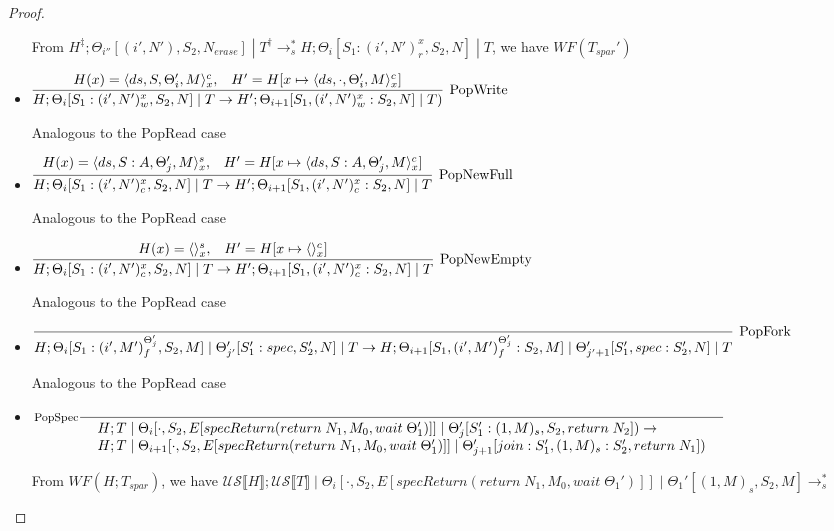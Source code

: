 \documentclass[9pt]{article}
\newcommand\specStep{\rightarrow_{s}}
\newcommand{\eval}[1]{E[#1]}
\newcommand{\unSpec}[1]{\mathcal{US} \llbracket #1 \rrbracket}
\begin{document}
\begin{proof}
\begin{itemize}
From $H^\ddagger; \Theta_{i''}[(i', N'), S_2, N_{erase}] \; | \; T^\dagger \specStep^* H; \Theta_i[S_1 : (i', N')_r^x, S_2, N] \; | \; T$, we have $WF(T_{spar}')$

\item $\infer[\text{PopWrite}]{H; \Theta_i[S_1: (i', N')_w^x, S_2, N] \; | \; T \rightarrow H'; \Theta_{i+1}[S_1, (i', N')_w^x : S_2, N] \; | \; T)}{H(x) = \langle ds, S, \Theta_i', M\rangle_x^c, \;\;\; H' = H[x \mapsto \langle ds, \cdot, \Theta_i', M\rangle_x^c]}$

Analogous to the PopRead case

\item $\infer[\text{PopNewFull}]{H; \Theta_i[S_1 : (i', N')_c^x, S_2, N] \; | \; T \rightarrow H';  \Theta_{i+1}[S_1, (i', N')_c^x : S_2, N] \; | \; T}{H(x) = \langle ds, S:A, \Theta_j', M \rangle_x^s, \;\;\; H' = H[x \mapsto \langle ds, S:A, \Theta_j', M\rangle_x^c]}$

Analogous to the PopRead case

\item $\infer[\text{PopNewEmpty}]{H; \Theta_i[S_1 : (i', N')_c^x, S_2, N] \; | \; T \rightarrow H';  \Theta_{i+1}[S_1, (i', N')_c^x : S_2, N] \; | \; T}{H(x) = \langle \rangle_x^s, \;\;\; H' = H[x \mapsto \langle \rangle_x^c]}$

Analogous to the PopRead case

\item $\infer[\text{PopFork}]{H; \Theta_i[S_1 : (i', M')_f^{\Theta_j'}, S_2, M] \; | \; \Theta_{j'}'[S_1' : spec, S_2', N] \; | \; T \rightarrow H; \Theta_{i+1}[S_1, (i', M')_f^{\Theta_j'} : S_2, M] \; | \; \Theta_{j' + 1}'[S_1', spec : S_2', N] \; | \; T}{}$

Analogous to the PopRead case

\item $\inference[\text{PopSpec}]{}{\begin{array}{l} H; T \; | \; \Theta_i[\cdot, S_2, \eval{specReturn(return \; N_1, M_0, wait \; \Theta_1')}] \; | \; \Theta_j'[S_1' : (1, M)_s, S_2, return \; N_2]) \rightarrow \\ H; T \; | \; \Theta_{i+1}[\cdot, S_2, \eval{specReturn(return \; N_1, M_0, wait \; \Theta_1')}] \; | \; \Theta_{j+1}'[join : S_1', (1, M)_s : S_2', return \; N_1]) \end{array}}$


From $WF(H; T_{spar})$, we have $\unSpec{H}; \unSpec{T} \; | \; \Theta_i[\cdot, S_2, \eval{specReturn(return \; N_1, M_0, wait \; \Theta_1')}] \; | \; \Theta_1'[(1, M)_s, S_2, M] \specStep^* $


\end{itemize}
\end{proof}
\end{document}
